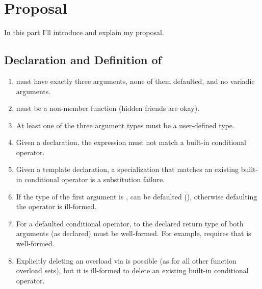 \section{Proposal}

In this part I'll introduce and explain my proposal.

\subsection{Declaration and Definition of }
\begin{enumerate}
  \item {} must have exactly three arguments, none of them
    defaulted, and no variadic arguments.

  \item {} must be a non-member function (hidden friends are
    okay).

  \item At least one of the three argument types must be a user-defined type.

  \item Given a  declaration, the expression
     must not match a built-in conditional operator.

  \item Given a template  declaration, a
    specialization that matches an existing built-in conditional operator is a
    substitution failure.

  \item If the type of the first argument is ,  can
    be defaulted (), otherwise defaulting the operator is
    ill-formed.

  \item For a defaulted conditional operator,  to the
    declared return type of both arguments (as declared) must be well-formed.
    For example,  requires that
     is well-formed.

  \item Explicitly deleting an  overload via 
    is possible (as for all other function overload sets), but it is ill-formed
    to delete an existing built-in conditional operator.
\end{enumerate}

